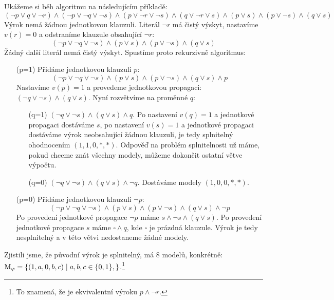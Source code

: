 \begin{example}
    Ukážeme si běh algoritmu na následujícím příkladě:
    $$
    (\neg p\lor q\lor \neg r)\land(\neg p\lor\neg q\lor\neg s)\land(p\lor \neg r\lor \neg s)\land(q\lor \neg r\lor s)\land (p\lor s)\land(p\lor\neg s)\land(q\lor s)
    $$
    Výrok nemá žádnou jednotkovou klauzuli. Literál $\neg r$ má čistý výskyt, nastavíme  $v(r)=0$ a odstraníme klauzule obsahující $\neg r$:
    $$
    (\neg p\lor\neg q\lor\neg s)\land (p\lor s)\land(p\lor\neg s)\land(q\lor s)
    $$
    Žádný další literál nemá čistý výskyt. Spustíme proto rekurzivně algoritmus:
    \begin{itemize}
        \item[(p=1)] Přidáme jednotkovou klauzuli $p$:
        $$
        (\neg p\lor\neg q\lor\neg s)\land (p\lor s)\land(p\lor\neg s)\land(q\lor s)\land p
        $$
        Nastavíme $v(p)=1$ a provedeme jednotkovou propagaci: $(\neg q\lor\neg s)\land(q\lor s)$. Nyní rozvětvíme na proměnné $q$:
        \begin{itemize}
            \item[(q=1)] $(\neg q\lor\neg s)\land(q\lor s)\land q$. Po nastavení $v(q)=1$ a jednotkové propagaci dostáváme $s$, po nastavení $v(s)=1$ a jednotkové propagaci dostáváme výrok neobsahující žádnou klauzuli, je tedy splnitelný ohodnocením $(1,1,0,*,*)$. Odpověď na problém splnitelnosti už máme, pokud chceme znát všechny modely, můžeme dokončit ostatní větve výpočtu.
            \item[(q=0)] $(\neg q\lor\neg s)\land(q\lor s)\land \neg q$. Dostáváme modely $(1,0,0,*,*)$.
            
        \end{itemize}
        \item[(p=0)] Přidáme jednotkovou klauzuli $\neg p$:
        $$
        (\neg p\lor\neg q\lor\neg s)\land (p\lor s)\land(p\lor\neg s)\land(q\lor s)\land \neg p
        $$
        Po provedení jednotkové propagace $\neg p$ máme $s\land \neg s\land(q\lor s)$. Po provedení jednotkové propagace $s$ máme $\square\land q$, kde $\square$ je prázdná klauzule. Výrok je tedy nesplnitelný a v této větvi nedostaneme žádné modely. 
    \end{itemize}

Zjistili jsme, že původní výrok je splnitelný, má 8 modelů, konkrétně: $\operatorname{M}_\varphi=\{(1,a,0,b,c)\mid a,b,c\in\{0,1\},\}$.\footnote{To znamená, že je ekvivalentní výroku $p\land \neg r$.}
    
\end{example}